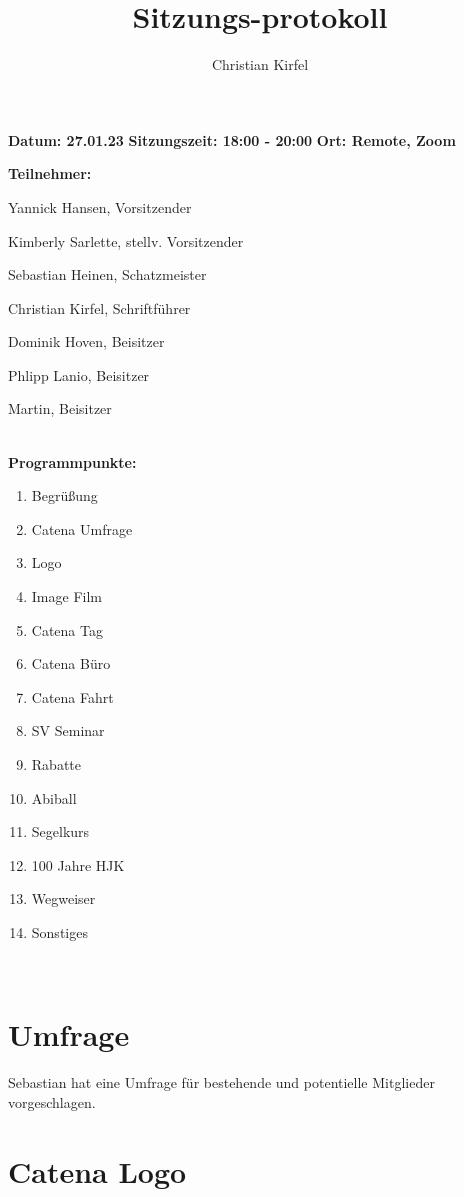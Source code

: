\documentclass[a4paper, 11pt]{article}
\title{Sitzungs-protokoll}
\author{Christian Kirfel}
\begin{document}
\pagestyle{style1}

\textbf{Datum: 27.01.23} %
\textbf{Sitzungszeit: 18:00 - 20:00}
\textbf{Ort: Remote, Zoom} %

\textbf{Teilnehmer:} %
\begin{description}
\item Yannick Hansen, Vorsitzender
\item Kimberly Sarlette, stellv. Vorsitzender
\item Sebastian Heinen, Schatzmeister
\item Christian Kirfel, Schriftführer
\item Dominik Hoven, Beisitzer
\item Phlipp Lanio, Beisitzer
\item Martin, Beisitzer
\end{description}

\newpage

\makebox[\linewidth]{\rule{\linewidth}{0.4pt}}\\
\textbf{Programmpunkte:} 
\begin{enumerate}
\item Begrüßung
\item Catena Umfrage
\item Logo
\item Image Film
\item Catena Tag
\item Catena Büro
\item Catena Fahrt
\item SV Seminar
\item Rabatte
\item Abiball
\item Segelkurs
\item 100 Jahre HJK
\item Wegweiser
\item Sonstiges
\end{enumerate}
\makebox[\linewidth]{\rule{\linewidth}{0.4pt}}\\

\newpage

\section*{Umfrage}

Sebastian hat eine Umfrage für bestehende und potentielle Mitglieder vorgeschlagen.

\section*{Catena Logo}
\end{document}
